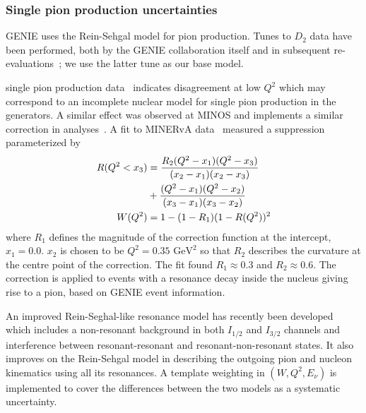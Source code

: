 \subsubsection{Single pion production uncertainties}
GENIE uses the Rein-Sehgal model for pion production. Tunes to $D_2$ data have been performed, both by the GENIE collaboration itself and in subsequent re-evaluations~\cite{Rodrigues:2016xjj}; we use the latter tune as our base model.

\minerva single pion production data~\cite{Altinok:2017xua,McGivern:2016bwh,Eberly:2014mra} indicates disagreement at low $Q^2$ which may correspond to an incomplete nuclear model for single pion production in the generators. A similar effect was observed at MINOS\cite{minos_pi_q2} and \nova implements a similar correction in analyses~\cite{nova_2018}.
A fit to MINERvA data~\cite{StowellThesis} measured a suppression parameterized by
\begin{align}
R(Q^2<x_3) & = \frac{R_{2} (Q^2-x_1)(Q^2-x_3)}{(x_2-x_1)(x_2-x_3)} \notag\\
             & + \frac{(Q^2-x_1)(Q^2-x_2)}{(x_3-x_1)(x_3-x_2)}  \\
W(Q^{2}) &= 1-(1-R_{1})(1-R(Q^{2}))^{2}
\end{align}
where $R_{1}$ defines the magnitude of the correction function at the intercept, $x_{1}=0.0$. $x_{2}$ is chosen to be $Q^2=0.35\text{ GeV}^2$ so that $R_{2}$ describes the curvature at the centre point of the correction. The fit found $R_1\approx0.3$ and $R_2\approx0.6$. The correction is applied to events with a resonance decay inside the nucleus giving rise to a pion, based on GENIE event information. 

An improved Rein-Seghal-like resonance model has recently been developed~\cite{minoo} which includes a non-resonant background in both $I_{1/2}$ and $I_{3/2}$ channels and interference between resonant-resonant and resonant-non-resonant states. %
It also improves on the Rein-Sehgal model in describing the outgoing pion and nucleon kinematics using all its resonances.
A template weighting in $(W, Q^2, E_\nu)$ is implemented to cover the differences between the two models as a systematic uncertainty.

